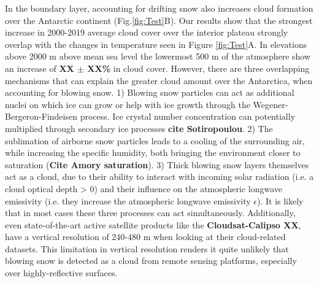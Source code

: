 \documentclass[12pt]{article}
\begin{document}
In the boundary layer, accounting for drifting snow also increases cloud formation over the Antarctic continent (Fig.\ref{fig:Test}B). Our results show that the strongest increase in 2000-2019 average cloud cover over the interior plateau strongly overlap with the changes in temperature seen in Figure \ref{fig:Test}A. In elevations above 2000 m above mean sea level the lowermost 500 m of the atmosphere show an increase of \textbf{XX $\pm$ XX\%} in cloud cover. However, there are three overlapping mechanisms that can explain the greater cloud amount over the Antarctica, when accounting for blowing snow. 1) Blowing snow particles can act as additional nuclei on which ice can grow or help with ice growth through the Wegener-Bergeron-Findeisen process. Ice crystal number concentration can potentially multiplied through secondary ice processes \textbf{cite Sotiropoulou}. 2) The sublimation of airborne snow particles leads to a cooling of the surrounding air, while increasing the specific humidity, both bringing the environment closer to saturation (\textbf{Cite Amory saturation}). 3) Thick blowing snow layers themselves act as a cloud, due to their ability to interact with incoming solar radiation (i.e. a cloud optical depth > 0) and their influence on the atmospheric longwave emissivity (i.e. they increase the atmospheric longwave emissivity $\epsilon$). It is likely that in most cases these three processes can act simultaneously. Additionally, even state-of-the-art active satellite products like the \textbf{Cloudsat-Calipso XX}, have a vertical resolution of 240-480 m when looking at their cloud-related datasets. This limitation in vertical resolution renders it quite unlikely that blowing snow is detected as a cloud from remote sensing platforms, especially over highly-reflective surfaces.
\end{document}
